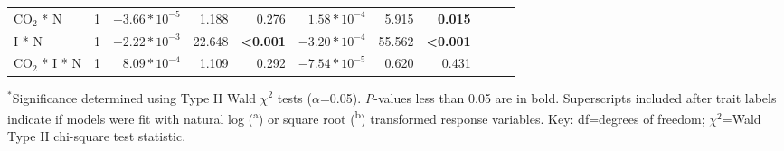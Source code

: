 \begin{landscape}
\begin{table}
{\begin{tabular}{p{3cm}p{0.5cm}p{1.75cm}p{1.5cm}p{1.5cm}p{1.75cm}p{1.5cm}p{1.5cm}p{1.75cm}p{1.5cm}p{1.5cm}}
            CO$_2$ * N & \multicolumn{1}{r}{1}
            & \multicolumn{1}{r}{$-3.66*10^{-5}$}   & \multicolumn{1}{r}{1.188}         & \multicolumn{1}{r}{0.276}
            & \multicolumn{1}{r}{$1.58*10^{-4}$}    & \multicolumn{1}{r}{5.915}         & \multicolumn{1}{r}{\textbf{0.015}}
            &&&
            \\

            I * N & \multicolumn{1}{r}{1}
            & \multicolumn{1}{r}{$-2.22*10^{-3}$}   & \multicolumn{1}{r}{22.648}        & \multicolumn{1}{r}{\textbf{<0.001}}
            & \multicolumn{1}{r}{$-3.20*10^{-4}$}   & \multicolumn{1}{r}{55.562}        & \multicolumn{1}{r}{\textbf{<0.001}}
            &&&
            \\

            CO$_2$ * I * N & \multicolumn{1}{r}{1}
            & \multicolumn{1}{r}{$8.09*10^{-4}$}    & \multicolumn{1}{r}{1.109}         & \multicolumn{1}{r}{0.292}
            & \multicolumn{1}{r}{$-7.54*10^{-5}$}   & \multicolumn{1}{r}{0.620}         & \multicolumn{1}{r}{0.431}
            &&&
            \\
            \hline
    \end{tabular}}
    \label{tab:table5.4}
    \end{table}
    \begin{singlespace}
        \noindent $^*$Significance determined using Type II Wald $\chi^2$ tests ($\alpha$=0.05). \textit{P}-values less than 0.05 are in bold. Superscripts included after trait labels indicate if models were fit with natural log (\textsuperscript{a}) or square root (\textsuperscript{b}) transformed response variables. Key: df=degrees of freedom; $\chi^2$=Wald Type II chi-square test statistic.
    \end{singlespace}
\end{landscape}
\clearpage

